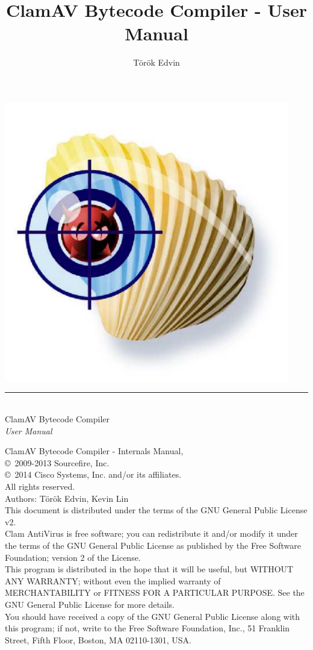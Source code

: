 \documentclass[a4paper,titlepage,english]{book}
\title{ClamAV Bytecode Compiler - User Manual}
\author{T\"{o}r\"{o}k Edvin}
\begin{document}
\frontmatter
\setcounter{page}{0}
\pagestyle{empty}
\includegraphics[width=353pt]{clam}
\vspace{3cm}
\begin{flushright}
  \rule[-1ex]{8cm}{3pt}\\
  \huge ClamAV Bytecode Compiler\\
        \huge \emph{User Manual}\\
\end{flushright}
\newpage
\setcounter{page}{1}
\pagestyle{fancy}
\tableofcontents
\vspace{1.0cm}
\noindent
\begin{boxedminipage}[b]{\textwidth}
    ClamAV Bytecode Compiler - Internals Manual,\\
    \copyright \  2009-2013 Sourcefire, Inc.\\
    \copyright \  2014 Cisco Systems, Inc. and/or its affiliates.\\
    All rights reserved.\\
    Authors: T\"{o}r\"{o}k Edvin, Kevin Lin\\
    This document is distributed under the terms of the GNU General
    Public License v2.\\

    Clam AntiVirus is free software; you can redistribute it and/or modify
    it under the terms of the GNU General Public License as published by
    the Free Software Foundation; version 2 of the License.\\

    This program is distributed in the hope that it will be useful,
    but WITHOUT ANY WARRANTY; without even the implied warranty of
    MERCHANTABILITY or FITNESS FOR A PARTICULAR PURPOSE.  See the
    GNU General Public License for more details.\\

    You should have received a copy of the GNU General Public License
    along with this program; if not, write to the Free Software
    Foundation, Inc., 51 Franklin Street, Fifth Floor, Boston,
    MA 02110-1301, USA.
\end{boxedminipage}
\end{document}
